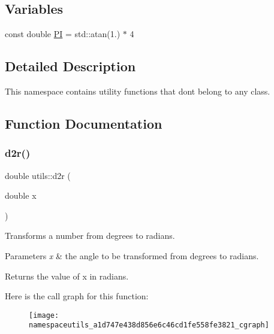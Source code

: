 \subsection*{Variables}
\begin{DoxyCompactItemize}
\item 
const double \hyperlink{namespaceutils_a92ce7d254229929886551de7417e1912}{PI} = std\+::atan(1.) $\ast$ 4
\end{DoxyCompactItemize}


\subsection{Detailed Description}
This namespace contains utility functions that don\textquotesingle{}t belong to any class. 

\subsection{Function Documentation}
\mbox{\label{namespaceutils_a1d747e438d856e6c46cd1fe558fe3821}} 
\subsubsection{\texorpdfstring{d2r()}{d2r()}}
{\footnotesize\ttfamily double utils\+::d2r (\begin{DoxyParamCaption}\item[{double}]{x }\end{DoxyParamCaption})\hspace{0.3cm}{\ttfamily [inline]}}

Transforms a number from degrees to radians. 
\begin{DoxyParams}{Parameters}
{\em x} & the angle to be transformed from degrees to radians. \\
\hline
\end{DoxyParams}
\begin{DoxyReturn}{Returns}
the value of x in radians. 
\end{DoxyReturn}
Here is the call graph for this function\+:
\nopagebreak
\begin{figure}[H]
\begin{center}
\leavevmode
\texttt{[image: namespaceutils\_a1d747e438d856e6c46cd1fe558fe3821\_cgraph]}
\end{center}
\end{figure}
\mbox{\label{namespaceutils_acd746b43155fa3033001f28a91a71cec}} 
